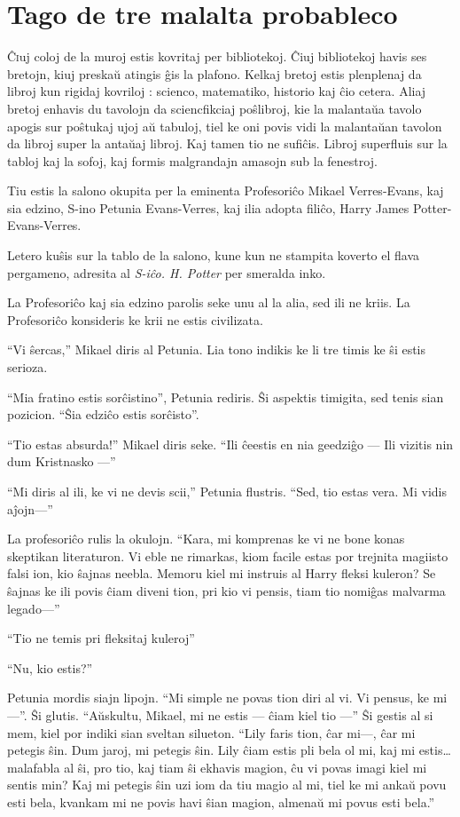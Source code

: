 \chapter{Tago de tre malalta probableco}

\lettrine{Ĉ}iuj coloj de la muroj estis kovritaj per bibliotekoj. Ĉiuj
bibliotekoj havis ses bretojn, kiuj preskaŭ atingis ĝis la
plafono. Kelkaj bretoj estis plenplenaj da libroj kun rigidaj kovriloj
: scienco, matematiko, historio kaj ĉio cetera. Aliaj bretoj enhavis
du tavolojn da sciencfikciaj poŝlibroj, kie la malantaŭa tavolo
apogis sur poŝtukaj ujoj aŭ tabuloj, tiel ke oni povis vidi la malantaŭan
tavolon da libroj super la antaŭaj libroj. Kaj tamen tio ne
sufiĉis. Libroj superfluis sur la tabloj kaj la sofoj, kaj formis
malgrandajn amasojn sub la fenestroj.

Tiu estis la salono okupita per la eminenta Profesoriĉo Mikael
Verres-Evans, kaj sia edzino, S-ino Petunia Evans-Verres, kaj
ilia adopta filiĉo, Harry James Potter-Evans-Verres. 

Letero kuŝis sur la tablo de la salono, kune kun ne stampita koverto
el flava pergameno, adresita al \emph{S-iĉo. H. Potter} per smeralda
inko.

La Profesoriĉo kaj sia edzino parolis seke unu al la alia, sed ili ne
kriis. La Profesoriĉo konsideris ke krii ne estis civilizata.

``Vi ŝercas,'' Mikael diris al Petunia. Lia tono indikis ke li tre
timis ke ŝi estis serioza.

``Mia fratino estis sorĉistino'', Petunia rediris. Ŝi aspektis timigita,
sed tenis sian pozicion. ``Ŝia edziĉo estis sorĉisto''.

``Tio estas absurda!'' Mikael diris seke. ``Ili ĉeestis en nia geedziĝo — Ili
vizitis nin dum Kristnasko —''

``Mi diris al ili, ke vi ne devis scii,'' Petunia flustris. ``Sed, tio
estas vera. Mi vidis aĵojn—''

La profesoriĉo rulis la okulojn. ``Kara, mi komprenas ke vi ne bone
konas skeptikan literaturon. Vi eble ne rimarkas, kiom facile estas por
trejnita magiisto falsi ion, kio ŝajnas neebla. Memoru kiel mi
instruis al Harry fleksi kuleron? Se ŝajnas ke ili povis ĉiam diveni
tion, pri kio vi pensis, tiam tio nomiĝas malvarma legado—''

``Tio ne temis pri fleksitaj kuleroj''

``Nu, kio estis?''

Petunia mordis siajn lipojn. ``Mi simple ne povas tion diri al vi. Vi
pensus, ke mi —''. Ŝi glutis. ``Aŭskultu, Mikael, mi ne estis — ĉiam
kiel tio —'' Ŝi gestis al si mem, kiel por indiki sian sveltan
silueton. ``Lily faris tion, ĉar mi—, ĉar mi petegis ŝin. Dum jaroj,
mi petegis ŝin. Lily ĉiam estis pli bela ol mi, kaj mi estis\ldots{}
malafabla al ŝi, pro tio, kaj tiam ŝi ekhavis magion, ĉu vi povas
imagi kiel mi sentis min? Kaj mi petegis ŝin uzi iom da tiu magio al
mi, tiel ke mi ankaŭ povu esti bela, kvankam mi ne povis havi ŝian
magion, almenaŭ mi povus esti bela.''


